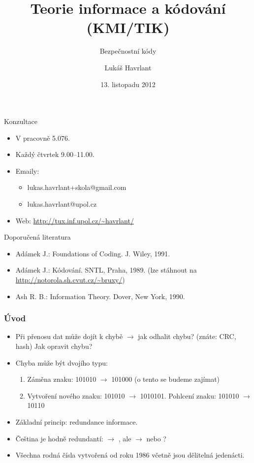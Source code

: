 \documentclass{beamer}
\title{Teorie informace a kódování (KMI/TIK)}
\subtitle{Bezpečnostní kódy}
\author{Lukáš Havrlant}
\date{13. listopadu 2012}
\institute{Univerzita Palackého}
\newenvironment{itemizex}%
  {\large \begin{itemize}%
    \setlength{\itemsep}{8pt}%
    \setlength{\parskip}{8pt}}%
  {\end{itemize}}
\newenvironment{itemize4}%
  {\large \begin{itemize}%
    \setlength{\itemsep}{4pt}%
    \setlength{\parskip}{4pt}}%
  {\end{itemize}}
\begin{document}
\begin{frame}[t,plain]
\titlepage
\end{frame}


\begin{frame}[t,fragile]{Konzultace}
\begin{itemizex}
\item V pracovně 5.076.
\item Každý čtvrtek 9.00--11.00. 
\item Emaily:
  \begin{itemizex}
    \item lukas.havrlant+skola@gmail.com
    \item lukas.havrlant@upol.cz
  \end{itemizex}
\item Web: \url{http://tux.inf.upol.cz/~havrlant/}
\end{itemizex}
\end{frame}


\begin{frame}[t,fragile]{Doporučená literatura}
\begin{itemize}
    \item Adámek J.: Foundations of Coding. J. Wiley, 1991.
    \item Adámek J.: Kódování. SNTL, Praha, 1989. (lze stáhnout na \url{http://notorola.sh.cvut.cz/~bruxy/})
    \item Ash R. B.: Information Theory. Dover, New York, 1990.
\end{itemize}
\end{frame}


\begin{frame}[t,fragile]\frametitle{Úvod} 
    \begin{itemize4}
        \item Při přenosu dat může dojít k chybě $\longrightarrow$ jak odhalit chybu? (znáte: CRC, hash) Jak opravit chybu?
        \item Chyba může být dvojího typu:
            \begin{enumerate}
                \item Záměna znaku: 101010 $\longrightarrow$ 101000 (o tento se budeme zajímat)
                \item Vytvoření nového znaku: 101010 $\longrightarrow$ 1010101. Pohlcení znaku: 101010 $\longrightarrow$ 10110
            \end{enumerate}
        \item Základní princip: redundance informace. 
        \item Čeština je hodně redundantí:  $\longrightarrow$ , ale  $\longrightarrow$  nebo ?
        \item Všechna rodná čísla vytvořená od roku 1986 včetně jsou dělitelná jedenácti. 
    \end{itemize4}
\end{frame}
\end{document}
